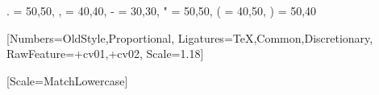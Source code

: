 
\usepackage{etoolbox}
\usepackage{ifthen}

\usepackage{graphicx}             %
\usepackage{xcolor}               %
\usepackage{booktabs}             %
\usepackage{multirow}             %
\usepackage{mathtools}            %
\usepackage{amsfonts,amssymb}     %
\usepackage{fancyhdr}             %
\usepackage{titlesec}             %
\usepackage{abstract}             %
\usepackage{authblk}              %
\usepackage{tabularx}             %
\usepackage{mdframed}             %
\usepackage{float}                %
\usepackage{caption}              %
\usepackage{subcaption}           %
\usepackage{enumitem}             %
\usepackage{fontawesome5}         %
\usepackage{doi}                  %
\usepackage{orcidlink}            %
\usepackage{lastpage}             %
\usepackage{textcomp}             %
\usepackage{csquotes}             %
\usepackage{siunitx}              %
\usepackage{marginnote}           %
\usepackage{pdfpages}             %

\usepackage{fontspec}%
\usepackage[final]{microtype}%
{ . = {50,50}, , = {40,40}, - = {30,30}, " = {50,50}, ( = {40,50}, ) = {50,40} }
\renewcommand{\normalsize}{\fontsize{10pt}{14pt}\selectfont}
\topskip=14pt

\setmainfont{Libertinus Serif}
[Numbers={OldStyle,Proportional},
Ligatures={TeX,Common,Discretionary},
RawFeature={+cv01,+cv02}, %
Scale=1.18]

\usepackage{unicode-math}
[Scale=MatchLowercase]

